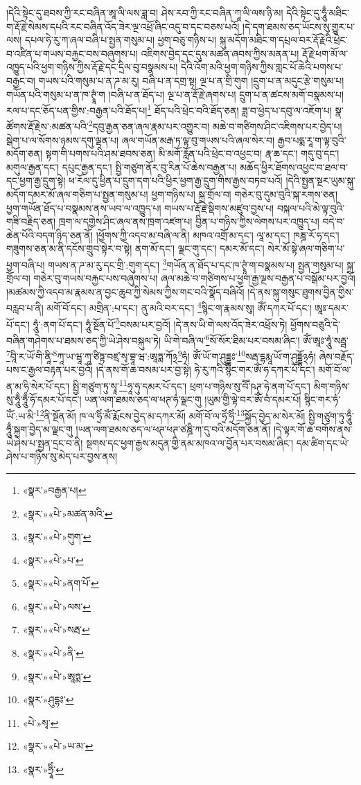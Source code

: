 །དེའི་སྟེང་དུ་ཐབས་ཀྱི་རང་བཞིན་ཨཱ་ལི་ལས་ཟླ་བ། ཤེས་རབ་ཀྱི་རང་བཞིན་ཀཱ་ལི་ལས་ཉི་མ། དེའི་སྟེང་དུ་ཧཱུྃ་མཐིང་ག་རྡོ་རྗེ་སེམས་དཔའི་རང་བཞིན་འོད་ཟེར་ལྔ་འཕྲོ་ཞིང་འདུ་བ་དང་བཅས་པའོ། །དེ་དག་ཐམས་ཅད་ཡོངས་སུ་གྱུར་པ་ལས། དཔལ་ཧེ་རུ་ཀ་ཞལ་བཞི་པ་སྤྱན་གསུམ་པ། ཕྱག་བཅུ་གཉིས་པ། སྐུ་མདོག་མཐིང་ག་དཔྲལ་བར་རྡོ་རྗེའི་ཕྲེང་བ་འཛིན་པ་གཡས་བརྐྱང་བས་བཞུགས་པ། འཇིགས་བྱེད་དང་དུས་མཚན་ཞབས་ཀྱིས་མནན་པ། རྡོ་རྗེ་ཕག་མོ་ལ་འཁྱུད་པའི་ཕྱག་གཉིས་ཀྱིས་རྡོ་རྗེ་དང་དྲིལ་བུ་བསྣམས་པ། དེའི་འོག་མའི་ཕྱག་གཉིས་ཀྱིས་གླང་པོ་ཆེའི་པགས་པ་བརྒྱང་བ། གཡས་པའི་གསུམ་པ་ན་ཌ་མ་རུ། བཞི་པ་ན་དགྲ་སྟ། ལྔ་པ་ན་གྲི་གུག །དྲུག་པ་ན་མདུང་རྩེ་གསུམ་པ། གཡོན་པའི་གསུམ་པ་ན་ཁ་ཊྭཱཾ་ག །བཞི་པ་ན་ཐོད་པ། ལྔ་པ་ན་རྡོ་རྗེ་ཞགས་པ། དྲུག་པ་ན་ཚངས་མགོ་བསྣམས་པ། རལ་པ་དང་ཅོད་པན་གྱིས་:བརྒྱན་པའི་ཐོད་པ།\footnote{«སྣར་»བརྒྱན་པ།} ཐོད་པའི་ཕྲེང་བའི་ཐོད་ཅན། ཟླ་བ་ཕྱེད་པ་དབུ་ལ་འཇོག་པ། སྣ་ཚོགས་རྡོ་རྗེས་:མཚན་པའི་\footnote{«སྣར་»«པེ་»མཚན་མའི་}དབུ་རྒྱན་ཅན་ཞལ་རྣམ་པར་འགྱུར་བ། མཆེ་བ་གཙིགས་ཤིང་འཇིགས་པར་བྱེད་པ། སྒེག་པ་ལ་སོགས་ཉམས་དགུ་ལྡན་པ། ཞལ་གཡོན་མརྒ་ཏ་ལྟ་བུ་གཡས་པའི་ཞལ་སེར་བ། རྒྱབ་པདྨ་རཱ་ག་ལྟ་བུའི་མདོག་ཅན། སྟག་གི་པགས་པའི་ཤམ་ཐབས་ཅན། མི་མགོ་རློན་པའི་ཕྲེང་བ་འཕྱང་བ། རྣ་ཆ་དང་། གདུ་བུ་དང་། མགུལ་རྒྱན་དང་། དཔུང་རྒྱན་དང་། སྤྱི་གཙུག་ནོར་བུ་རིན་པོ་ཆེས་བརྒྱན་པ། མཆོད་ཕྱིར་ཐོགས་འཕྱང་བ་ཐལ་བ་དང་ཕྱག་རྒྱ་དྲུག་སྟེ། ཕ་རོལ་དུ་ཕྱིན་པ་དྲུག་དག་པའི་ཕྱིར་ཕྱག་རྒྱ་དྲུག་གིས་རྒྱས་བཏབ་པའོ། །དེའི་སྤྱན་སྔར་ཡུམ་སྐུ་མདོག་དམར་མོ་ཞལ་གཅིག་པ་སྤྱན་གསུམ་པ། ཕྱག་གཉིས་པ། སྐྲ་གྲོལ་བ། གཅེར་བུ་དུམ་བུའི་སྐ་རགས་ཅན། ཕྱག་གཡོན་ཐོད་པ་བསྣམས་ནས་ཡབ་ལ་འཁྱུད་པ། གཡས་པ་རྡོ་རྗེ་སྡིགས་མཛུབ་བྱས་པ། བསྐལ་པའི་མེ་ལྟ་བུའི་གཟི་བརྗིད་ཅན། ཁྲག་ལ་དགྱེས་ཤིང་ཞལ་ནས་ཁྲག་འཛག་པ། བྱིན་པ་གཉིས་ཀྱིས་ལེགས་པར་འཁྱུད་པ། བདེ་བ་ཆེན་པོའི་བདག་ཉིད་ཅན་ནོ། །ཕྱོགས་ཀྱི་འདབ་མ་བཞི་ལ་ནི། མཁའ་འགྲོ་མ་དང་། ལཱ་མ་དང་། ཁཎྜ་རོ་ཧ་དང་། གཟུགས་ཅན་མ་ནི་དངོས་གྲུབ་སྟེར་བ་སྟེ། ནག་མོ་དང་། ལྗང་གུ་དང་། དམར་མོ་དང་། སེར་མོ་སྟེ་ཞལ་གཅིག་པ་ཕྱག་བཞི་པ། གཡས་ན་ཌ་མ་རུ་དང་གྲི་:གུག་དང་། \footnote{«སྣར་»«པེ་»གུག་}གཡོན་ན་ཐོད་པ་དང་ཁ་ཊྭཱཾ་ག་བསྣམས་པ། སྤྱན་གསུམ་པ། སྐྲ་གྲོལ་བ། གཅེར་བུ་གཡས་བརྐྱང་པས་བཞུགས་པ། ཞལ་མཆེ་བ་གཙིགས་པ་ཕྱག་རྒྱ་ལྔས་བརྒྱན་པ་བསྒོམ་པར་བྱའོ། །མཚམས་ཀྱི་འདབ་མ་རྣམས་ན་བྱང་ཆུབ་ཀྱི་སེམས་ཀྱིས་གང་བའི་སྣོད་བཞིའོ། །དེ་ནས་སྐུ་གསུང་ཐུགས་བྱིན་གྱིས་བརླབ་པ་ནི། མགོ་བོ་དང་། མགྲིན་:པ་དང་། ནུ་མའི་བར་དང་། \footnote{«སྣར་»«པེ་»པ་}སྙིང་ག་རྣམས་སུ། ཨོཾ་དཀར་པོ་དང་། ཨཱཿ་དམར་པོ་དང་། ཧཱུཾ་:ནག་པོ་དང་། ཧཱུཾ་སྔོན་པོ་\footnote{«སྣར་»«པེ་»ནག་པོ་}བསམ་པར་བྱའོ། །དེ་ནས་ཡི་གེ་ལས་འོད་ཟེར་འཕྲོས་ཏེ། ཕྱོགས་བཅུའི་དེ་བཞིན་གཤེགས་པ་ཐམས་ཅད་ཀྱི་ཡེ་ཤེས་བསྐུལ་ཏེ། ཡི་གེ་བཞི་ལ་\footnote{«སྣར་»«པེ་»ལས་}སོ་སོར་ཐིམ་པར་བསམ་ཞིང་། ཨོཾ་ཨཱཿ་ཧཱུཾ་སརྦྦ་\footnote{«སྣར་»«པེ་»སརྦ་}བཱི་ར་ཡོ་གི་ནཱི་\footnote{«སྣར་»«པེ་»ནི་}ཀཱ་ཡ་ཝཱ་ཀཱ་ཙིཏྟ་བཛྲ་སྭ་བྷཱ་ཝ་:ཨཱཏྨ་ཀོ྅\footnote{«སྣར་»«པེ་»ཨཱཏྨ་}ཧཾ། ཨོཾ་ཡོ་ག་ཤུདྡྷཿ་\footnote{«སྣར་»ཤུདྷཿ་}སརྦ་དྷརྨཱ་ཡོ་ག་ཤུདྡྷོ྅ཧཾ། ཞེས་བརྗོད་པས་ང་རྒྱལ་བརྟན་པར་བྱའོ། །དེ་ནས་གོ་ཆ་བསམ་པར་བྱ་སྟེ། ཧེ་རུ་ཀའི་སྙིང་གར་ཨོཾ་ཧ་དཀར་པོ་དང་། མགོ་བོ་ལ་ན་མ་ཧི་སེར་པོ་དང་། སྤྱི་གཙུག་ཏུ་སྭཱ་\footnote{«པེ་»སྭ་}ཧཱ་ཧུ་དམར་པོ་དང་། ཕྲག་པ་གཉིས་སུ་བཽ་ཥཊ་ཧེ་ནག་པོ་དང་། མིག་གཉིས་སུ་ཧཱུྃ་ཧཱུྃ་ཧོ་དམར་པོ་དང་། ཡན་ལག་ཐམས་ཅད་ལ་ཕཊ་ཧཾ་ལྗང་གུ །ཡུམ་གྱི་ལྟེ་བར་ཨོཾ་བཾ་དམར་པོ། སྙིང་གར་ཧཾ་ཡོཾ་:ཡ་མི་\footnote{«སྣར་»«པེ་»ཡ་མ་}ནི་སྔོན་མོ། ཁ་ལ་ཧྲིཾ་མོཾ་རྨོངས་བྱེད་མ་དཀར་མོ། མགོ་བོ་ལ་ཧྲེཾ་ཧྲིཾ་\footnote{«སྣར་»ཧྲཱིཾ་}སྐྱོད་བྱེད་མ་སེར་མོ། སྤྱི་གཙུག་ཏུ་ཧཱུྃ་ཧཱུྃ་སྐྲག་བྱེད་མ་ལྗང་གུ །ཡན་ལག་ཐམས་ཅད་ལ་ཕཊ་ཕཊ་ཙཎྜི་ཀ་དུ་བའི་མདོག་ཅན་ནོ། །དེ་ལྟར་གོ་ཆ་བགོས་ནས་ཡེ་ཤེས་པ་སྤྱན་དྲང་བ་ནི། སྔགས་དང་ཕྱག་རྒྱས་མདུན་གྱི་ནམ་མཁའ་ལ་བྱོན་པར་བསམ་ཞིང་། དམ་ཚིག་དང་ཡེ་ཤེས་པ་གཉིས་སུ་མེད་པར་བྱས་ནས། 